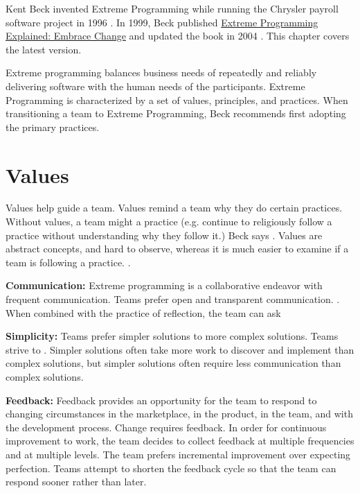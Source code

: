 Kent Beck invented Extreme Programming while running the Chrysler payroll software project in 1996 \cite{BeckExtremeProgramming1999}. In 1999, Beck published \underline{Extreme Programming Explained: Embrace Change}  \cite{BeckExtremeProgramming1999} and updated the book in 2004  \cite{BeckExtremeProgramming2004}. This chapter covers the latest version. 

Extreme programming balances business needs of repeatedly and reliably delivering software with the human needs of the participants. Extreme Programming is characterized by a set of values, principles, and practices. When transitioning a team to Extreme Programming, Beck recommends first adopting the primary practices. 
\section{Values}
Values help guide a team. Values remind a team why they do certain practices. Without values, a team might  a practice (e.g. continue to religiously follow a practice without understanding why they follow it.) Beck says  \cite{BeckExtremeProgramming2004}. Values are abstract concepts, and hard to observe, whereas it is much easier to examine if a team is following a practice.  \cite{BeckExtremeProgramming2004}.

\textbf{Communication:} Extreme programming is a collaborative endeavor with frequent communication. Teams prefer open and transparent communication. 
 \cite{BeckExtremeProgramming2004}. When combined with the practice of reflection, the team can ask  \cite{BeckExtremeProgramming2004}

\textbf{Simplicity:} Teams prefer simpler solutions to more complex solutions. Teams strive to  \cite{BeckExtremeProgramming2004}. Simpler solutions often take more work to discover and implement than complex solutions, but simpler solutions often require less communication than complex solutions.





\textbf{Feedback:} Feedback provides an opportunity for the team to respond to changing circumstances in the marketplace, in the product, in the team, and with the development process. Change requires feedback. In order for continuous improvement to work, the team decides to collect feedback at multiple frequencies and at multiple levels. The team prefers incremental improvement over expecting perfection. Teams attempt to shorten the feedback cycle so that the team can respond sooner rather than later.

